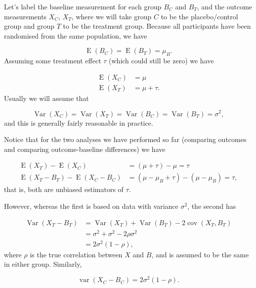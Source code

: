 \documentclass[
  openany]{book}
\theoremstyle{definition}
\theoremstyle{definition}
\theoremstyle{definition}
\theoremstyle{definition}
\theoremstyle{remark}
\begin{document}
Let's label the baseline measurement for each group \(B_C\) and \(B_T\), and the outcome measurements \(X_C,\,X_T\), where we will take group \(C\) to be the placebo/control group and group \(T\) to be the treatment group. Because all participants have been randomised from the same population, we have

\[\operatorname{E}\left(B_C\right) = \operatorname{E}\left(B_T\right) = \mu_B.\]
Assuming some treatment effect \(\tau\) (which could still be zero) we have

\[
\begin{aligned}
\operatorname{E}\left(X_C\right) & = \mu\\
\operatorname{E}\left(X_T\right) & = \mu + \tau.
\end{aligned}
\]
Usually we will assume that

\[\operatorname{Var}\left(X_C\right) = \operatorname{Var}\left(X_T\right) = \operatorname{Var}\left(B_C\right) = \operatorname{Var}\left(B_T\right) = \sigma^2,\]
and this is generally fairly reasonable in practice.

Notice that for the two analyses we have performed so far (comparing outcomes and comparing outcome-baseline differences) we have

\[
\begin{aligned}
\operatorname{E}\left(X_T\right) - \operatorname{E}\left(X_C\right) & = \left(\mu + \tau\right) - \mu = \tau\\
\operatorname{E}\left(X_T - B_T\right) - \operatorname{E}\left(X_C - B_C\right) & = \left(\mu - \mu_B + \tau\right) - \left(\mu - \mu_B\right) = \tau,
\end{aligned}
\]
that is, both are unbiased estimators of \(\tau\).

However, whereas the first is based on data with variance \(\sigma^2\), the second has

\[
\begin{aligned}
\operatorname{Var}\left(X_T-B_T\right) & = \operatorname{Var}\left(X_T\right) + \operatorname{Var}\left(B_T\right) - 2\operatorname{cov}\left(X_T,B_T\right)\\
& = \sigma^2 + \sigma^2 - 2\rho\sigma^2 \\
& = 2\sigma^2\left(1-\rho\right),
\end{aligned}
\]
where \(\rho\) is the true correlation between \(X\) and \(B\), and is assumed to be the same in either group. Similarly,

\[\operatorname{var}\left(X_C-B_C\right) = 2\sigma^2\left(1-\rho\right).\]
\end{document}
